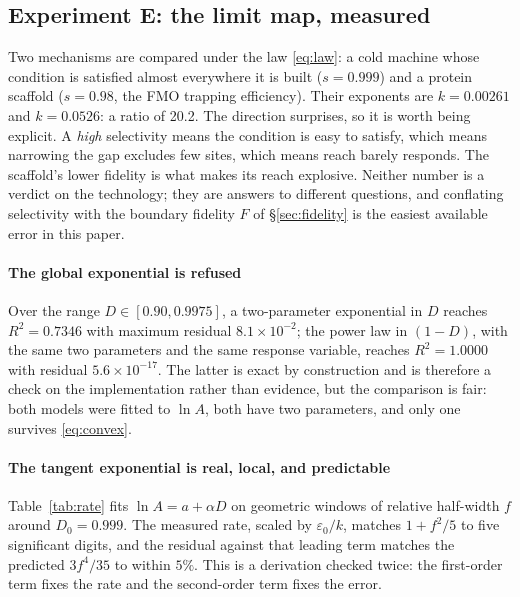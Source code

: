\documentclass[conference]{IEEEtran}
\theoremstyle{definition}
\begin{document}
\subsection{Experiment E: the limit map, measured}
\label{sec:limit}

Two mechanisms are compared under the law \eqref{eq:law}: a cold machine whose
condition is satisfied almost everywhere it is built ($s=0.999$) and a protein
scaffold ($s=0.98$, the FMO trapping efficiency). Their exponents are
$k=0.00261$ and $k=0.0526$: a ratio of \num{20.2}. The direction surprises, so it
is worth being explicit. A \emph{high} selectivity means the condition is easy to
satisfy, which means narrowing the gap excludes few sites, which means reach
barely responds. The scaffold's lower fidelity is what makes its reach explosive.
Neither number is a verdict on the technology; they are answers to different
questions, and conflating selectivity with the boundary fidelity $F$ of
\S\ref{sec:fidelity} is the easiest available error in this paper.

\paragraph{The global exponential is refused} Over the range
$D\in[0.90,0.9975]$, a two-parameter exponential in $D$ reaches
$R^{2}=0.7346$ with maximum residual $8.1\times10^{-2}$; the power law in
$(1-D)$, with the same two parameters and the same response variable, reaches
$R^{2}=1.0000$ with residual $5.6\times10^{-17}$. The latter is exact by
construction and is therefore a check on the implementation rather than evidence,
but the comparison is fair: both models were fitted to $\ln A$, both have two
parameters, and only one survives \eqref{eq:convex}.

\paragraph{The tangent exponential is real, local, and predictable}
Table~\ref{tab:rate} fits $\ln A=a+\alpha D$ on geometric windows of relative
half-width $f$ around $D_0=0.999$. The measured rate, scaled by
$\varepsilon_0/k$, matches $1+f^{2}/5$ to five significant digits, and the
residual against that leading term matches the predicted $3f^{4}/35$ to within
$5\%$. This is a derivation checked twice: the first-order term fixes the rate and
the second-order term fixes the error.

\begin{table}[t]
\centering
\caption{The local exponential rate on a geometric window. The measured column is
a least-squares fit; the analytic column is \eqref{eq:rate}. $R^2$ is identical at
every anchor difficulty, so only one is shown.}
\label{tab:rate}
\footnotesize

\end{table}
\end{document}

